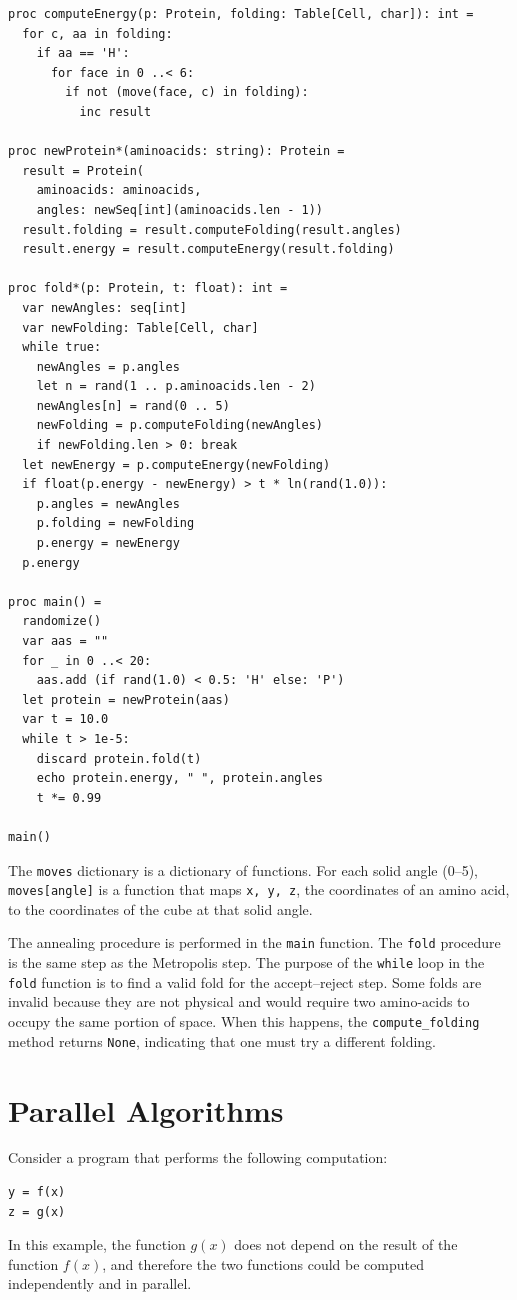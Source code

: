 \documentclass[justified, sixbynine]{tufte-book}
\def\ft{\small\tt}
\theoremstyle{plain}%
\newtheorem * {corollary}{Corollary}
\theoremstyle{definition}
\theoremstyle{remark}
\newtheorem * {remark}{Remark}
\newtheorem * {note}{Note}
\begin{document}
\begin{fullwidth}
\begin{lstlisting}[caption={in file: {\ft folding.nim}}]
proc computeEnergy(p: Protein, folding: Table[Cell, char]): int =
  for c, aa in folding:
    if aa == 'H':
      for face in 0 ..< 6:
        if not (move(face, c) in folding):
          inc result

proc newProtein*(aminoacids: string): Protein =
  result = Protein(
    aminoacids: aminoacids,
    angles: newSeq[int](aminoacids.len - 1))
  result.folding = result.computeFolding(result.angles)
  result.energy = result.computeEnergy(result.folding)

proc fold*(p: Protein, t: float): int =
  var newAngles: seq[int]
  var newFolding: Table[Cell, char]
  while true:
    newAngles = p.angles
    let n = rand(1 .. p.aminoacids.len - 2)
    newAngles[n] = rand(0 .. 5)
    newFolding = p.computeFolding(newAngles)
    if newFolding.len > 0: break
  let newEnergy = p.computeEnergy(newFolding)
  if float(p.energy - newEnergy) > t * ln(rand(1.0)):
    p.angles = newAngles
    p.folding = newFolding
    p.energy = newEnergy
  p.energy

proc main() =
  randomize()
  var aas = ""
  for _ in 0 ..< 20:
    aas.add (if rand(1.0) < 0.5: 'H' else: 'P')
  let protein = newProtein(aas)
  var t = 10.0
  while t > 1e-5:
    discard protein.fold(t)
    echo protein.energy, " ", protein.angles
    t *= 0.99

main()
\end{lstlisting}

The {\ft moves} dictionary is a dictionary of functions. For each solid angle (0--5), {\ft moves[angle]} is a function that maps {\ft x, y, z}, the coordinates of an amino acid, to the coordinates of the cube at that solid angle.

The annealing procedure is performed in the {\ft main} function. The {\ft fold} procedure is the same step as the Metropolis step. The purpose of the {\ft while} loop in the {\ft fold} function is to find a valid fold for the accept--reject step. Some folds are invalid because they are not physical and would require two amino-acids to occupy the same portion of space. When this happens, the {\ft compute\_folding} method returns {\ft None}, indicating that one must try a different folding.

\chapter{Parallel Algorithms}

Consider a program that performs the following computation:
\begin{lstlisting}
y = f(x)
z = g(x)
\end{lstlisting}
In this example, the function $g(x)$ does not depend on the result of the function $f(x)$, and therefore the two functions could be computed independently and in parallel.


\end{fullwidth}
\end{document}
